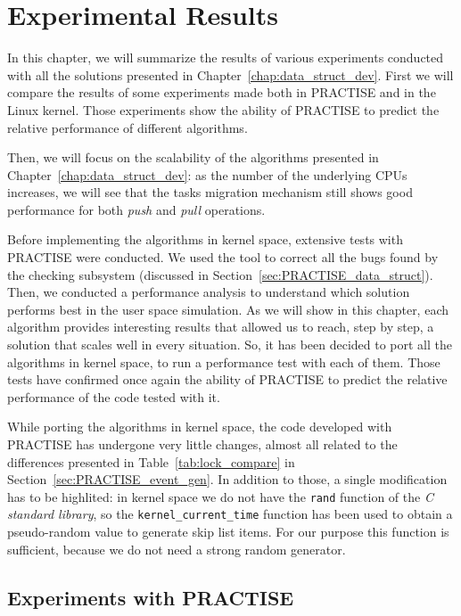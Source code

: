 \chapter{Experimental Results\label{chap:exp-results}}

In this chapter, we will summarize the results of various experiments
conducted with all the solutions presented in Chapter~\ref{chap:data_struct_dev}.
First we will compare the results of some experiments made both in PRACTISE 
and in the Linux kernel. Those experiments show the ability of PRACTISE to predict 
the relative performance of different algorithms.
 
Then, we will focus on the scalability of the algorithms presented in
Chapter~\ref{chap:data_struct_dev}: as the number
of the underlying CPUs increases, we will see that the tasks migration mechanism
still shows good performance for both \emph{push} and \emph{pull} operations.

Before implementing the algorithms in kernel space, extensive tests
with PRACTISE were conducted. We used the tool to correct all the bugs found by the
checking subsystem (discussed in Section~\ref{sec:PRACTISE_data_struct}). 
Then, we conducted a performance analysis to
understand which solution performs best in the user space simulation. As we
will show in this chapter, each algorithm provides interesting results that
allowed us to reach, step by step, a solution that scales well in every
situation. So, it has been decided to port all the algorithms in kernel space, 
to run a performance test with each of them. Those tests have confirmed once 
again the ability of PRACTISE to predict the relative performance of the code
tested with it.

While porting the algorithms in kernel space, the code developed with PRACTISE 
has undergone very little changes, almost all related to the differences presented
in Table~\ref{tab:lock_compare} in Section~\ref{sec:PRACTISE_event_gen}.
In addition to those, a single modification has to be highlited: in kernel
space we do not have the \texttt{rand} function of the \emph{C standard library},
so the \texttt{kernel\_current\_time} function has been used to obtain a 
pseudo-random value to generate skip list items. For our purpose this function
is sufficient, because we do not need a strong random generator.

\section{Experiments with PRACTISE\label{sec:PRACTISE_exp_setup}}

